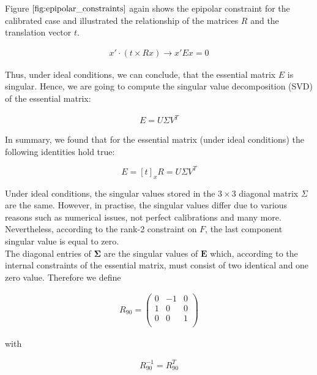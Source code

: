 \documentclass{paper}
\begin{document}
Figure $\ref{fig:epipolar_constraints}$ again shows the epipolar constraint for the calibrated case and illustrated the relationship of the matrices $R$ and the translation vector $t$. 

\begin{align}
    x' \cdot \left( t \times R x \right) \rightarrow x' E x = 0
\end{align}

Thus, under ideal conditions, we can conclude, that the essential matrix $E$ is singular. Hence, we are going to compute the singular value decomposition (SVD) of the essential matrix:

\begin{align}
    E = U \Sigma V^{T}
\end{align}

In summary, we found that for the essential matrix (under ideal conditions) the following identities hold true:

\begin{equation}
    E = [t]_x R = U \Sigma V^{T}
\end{equation}

Under ideal conditions, the singular values stored in the $3 \times 3$ diagonal matrix $\Sigma$ are the same. However, in practise, the singular values differ due to various reasons such as numerical issues, not perfect calibrations and many more. Nevertheless, according to the rank-2 constraint on $F$, the last component singular value is equal to zero. \\

The diagonal entries of $\mathbf{\Sigma}$ are the singular values of $\mathbf{E}$ which, according to the internal constraints of the essential matrix, must consist of two identical and one zero value. Therefore we define 

\begin{align}
    R_{90} = 
    \left(\begin{array}{rrr}
       0  & -1 &  0 \\
       1  &  0 &  0 \\
       0  & 0 &  1 \\
\end{array} \right)
\end{align}

with 

\begin{align}
    R_{90}^{-1} = R_{90}^{T}
\end{align}
\end{document}
